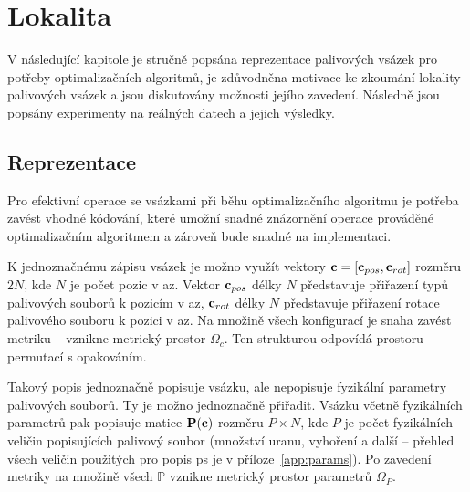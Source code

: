 \chapter{Lokalita}
\label{ch:new}
V následující kapitole je stručně popsána reprezentace palivových 
vsázek pro potřeby optimalizačních algoritmů, je zdůvodněna motivace 
ke zkoumání lokality palivových vsázek a jsou diskutovány možnosti jejího 
zavedení. Následně jsou popsány experimenty na reálných datech a jejich výsledky.

\section{Reprezentace}
\label{ch:repr}
Pro efektivní operace se vsázkami při běhu optimalizačního algoritmu je potřeba zavést vhodné kódování, které 
umožní snadné znázornění operace prováděné optimalizačním algoritmem a zároveň bude snadné na implementaci. 

K jednoznačnému zápisu vsázek je možno využít vektory $\mathbf{c} = \left[\mathbf{c}_{pos}, \mathbf{c}_{rot}\right]$ rozměru $2N$, kde $N$ 
je počet pozic v \ac{az}. Vektor $\mathbf{c}_{pos}$ délky $N$ představuje přiřazení typů palivových souborů k pozicím v \ac{az}, $\mathbf{c}_{rot}$ délky $N$ 
představuje přiřazení rotace palivového souboru k pozici v \ac{az}. Na množině všech konfigurací je snaha zavést metriku -- vznikne metrický 
prostor $\Omega_c$. Ten strukturou odpovídá prostoru permutací s opakováním.  

Takový popis jednoznačně popisuje vsázku, ale nepopisuje fyzikální parametry palivových souborů. Ty je možno jednoznačně přiřadit. 
Vsázku včetně fyzikálních parametrů pak popisuje matice $\mathbf{P(c)}$ rozměru $P\times N$, kde $P$ je počet fyzikálních veličin 
popisujících palivový soubor (množství uranu, vyhoření a další -- přehled všech veličin použitých pro popis \ac{ps} je v příloze~\ref{app:params}). 
Po zavedení metriky na množině všech $\mathbb{P}$ vznikne metrický prostor parametrů $\Omega_P$. 

